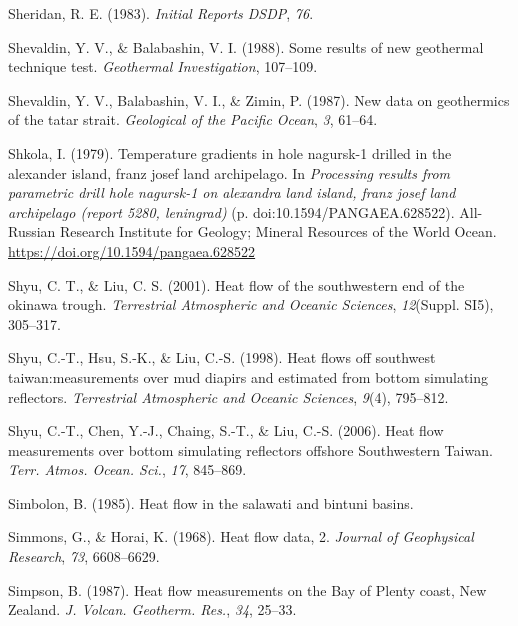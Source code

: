 \begin{CSLReferences}{1}{1}
\leavevmode{}%
Sheridan, R. E. (1983). \emph{Initial Reports DSDP}, \emph{76}.

\leavevmode{}%
Shevaldin, Y. V., \& Balabashin, V. I. (1988). Some results of new geothermal technique test. \emph{Geothermal Investigation}, 107--109.

\leavevmode{}%
Shevaldin, Y. V., Balabashin, V. I., \& Zimin, P. (1987). New data on geothermics of the tatar strait. \emph{Geological of the Pacific Ocean}, \emph{3}, 61--64.

\leavevmode{}%
Shkola, I. (1979). Temperature gradients in hole nagursk-1 drilled in the alexander island, franz josef land archipelago. In \emph{Processing results from parametric drill hole nagursk-1 on alexandra land island, franz josef land archipelago (report 5280, leningrad)} (p. doi:10.1594/PANGAEA.628522). All-Russian Research Institute for Geology; Mineral Resources of the World Ocean. \url{https://doi.org/10.1594/pangaea.628522}

\leavevmode{}%
Shyu, C. T., \& Liu, C. S. (2001). Heat flow of the southwestern end of the okinawa trough. \emph{Terrestrial Atmospheric and Oceanic Sciences}, \emph{12}(Suppl. SI5), 305--317.

\leavevmode{}%
Shyu, C.-T., Hsu, S.-K., \& Liu, C.-S. (1998). Heat flows off southwest taiwan:measurements over mud diapirs and estimated from bottom simulating reflectors. \emph{Terrestrial Atmospheric and Oceanic Sciences}, \emph{9}(4), 795--812.

\leavevmode{}%
Shyu, C.-T., Chen, Y.-J., Chaing, S.-T., \& Liu, C.-S. (2006). Heat flow measurements over bottom simulating reflectors offshore {Southwestern Taiwan}. \emph{Terr. Atmos. Ocean. Sci.}, \emph{17}, 845--869.

\leavevmode{}%
Simbolon, B. (1985). Heat flow in the salawati and bintuni basins.

\leavevmode{}%
Simmons, G., \& Horai, K. (1968). Heat flow data, 2. \emph{Journal of Geophysical Research}, \emph{73}, 6608--6629.

\leavevmode{}%
Simpson, B. (1987). Heat flow measurements on the {Bay of Plenty} coast, {New Zealand}. \emph{J. Volcan. Geotherm. Res.}, \emph{34}, 25--33.


\end{CSLReferences}
